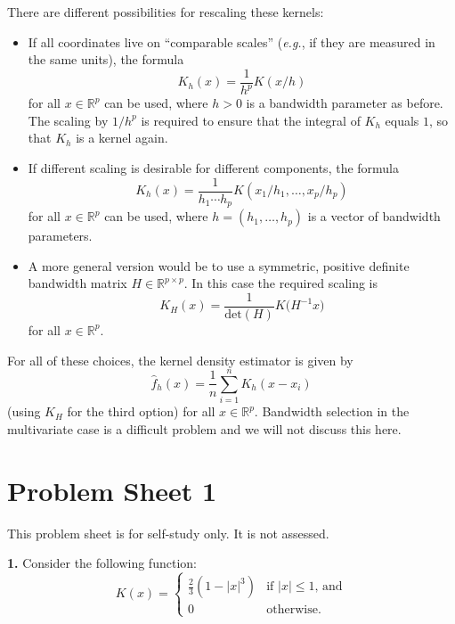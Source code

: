 \documentclass[
  a4paper,
]{article}
\theoremstyle{definition}
\theoremstyle{definition}
\theoremstyle{definition}
\theoremstyle{definition}
\theoremstyle{remark}
\begin{document}
There are different possibilities for rescaling these kernels:

\begin{itemize}
\item
  If all coordinates live on ``comparable scales'' (\emph{e.g.}, if they are
  measured in the same units), the formula
  \[ K_h(x) = \frac{1}{h^p} K(x/h) \]
  for all \(x\in\mathbb{R}^p\) can be used, where \(h>0\) is a bandwidth parameter
  as before. The scaling by \(1/h^p\) is required
  to ensure that the integral of \(K_h\) equals \(1\), so that \(K_h\) is
  a kernel again.
\item
  If different scaling is desirable for different components, the formula
  \begin{equation*}
    K_h(x)
    = \frac{1}{h_1 \cdots h_p} K(x_1/h_1, \ldots, x_p/h_p)
  \end{equation*}
  for all \(x\in\mathbb{R}^p\) can be used, where \(h = (h_1, \ldots, h_p)\) is a vector
  of bandwidth parameters.
\item
  A more general version would be to use a symmetric, positive definite
  bandwidth matrix \(H \in \mathbb{R}^{p\times p}\).
  In this case the required scaling is
  \begin{equation*}
    K_H(x)
    = \frac{1}{\mathrm{det}(H)} K\bigl( H^{-1} x \bigr)
  \end{equation*}
  for all \(x\in\mathbb{R}^p\).
\end{itemize}

For all of these choices, the kernel density estimator is given by
\begin{equation*}
  \hat f_h(x)
  = \frac{1}{n} \sum_{i=1}^n K_h(x - x_i)
\end{equation*}
(using \(K_H\) for the third option) for all \(x\in\mathbb{R}^p\).
Bandwidth selection in the multivariate case is a difficult problem
and we will not discuss this here.

\clearpage

\section*{Problem Sheet 1}\label{P01}

This problem sheet is for self-study only.
It is not assessed.

\textbf{1.} Consider the following function:
\begin{equation*}
K(x)
= \begin{cases}
  \frac23 (1 - |x|^3) & \mbox{if $|x|\leq 1$, and} \\
  0 & \text{otherwise}.
\end{cases}
\end{equation*}
\end{document}
